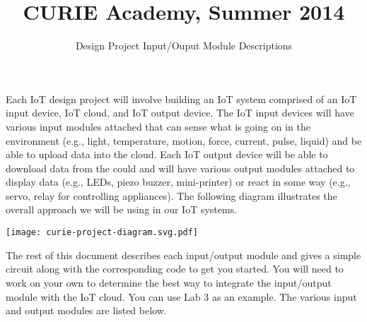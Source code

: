 \documentclass{cbxdoc}
\title{CURIE Academy, Summer 2014}
\subtitle{Design Project Input/Ouput Module Descriptions}
\makeatletter
\renewcommand\tableofcontents{%
    \@starttoc{toc}%
}
\makeatother
\begin{document}
\maketitle

Each IoT design project will involve building an IoT system comprised of
an IoT input device, IoT cloud, and IoT output device. The IoT input
devices will have various input modules attached that can sense what is
going on in the environment (e.g., light, temperature, motion, force,
current, pulse, liquid) and be able to upload data into the cloud. Each
IoT output device will be able to download data from the could and will
have various output modules attached to display data (e.g., LEDs, piezo
buzzer, mini-printer) or react in some way (e.g., servo, relay for
controlling appliances). The following diagram illustrates the overall
approach we will be using in our IoT systems.

\begin{center}
  \texttt{[image: curie-project-diagram.svg.pdf]}
\end{center}

The rest of this document describes each input/output module and gives a
simple circuit along with the corresponding code to get you started. You
will need to work on your own to determine the best way to integrate the
input/output module with the IoT cloud. You can use Lab 3 as an example.
The various input and output modules are listed below.

\begin{center}\small
 \begin{minipage}{0.8\textwidth}
   \tableofcontents
 \end{minipage}
\end{center}










%






\end{document}
